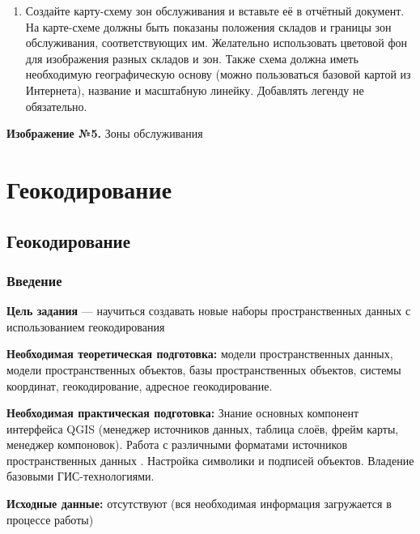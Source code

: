 \documentclass[
  12pt,
]{book}
\providecommand{\tightlist}{%
  \setlength{\itemsep}{0pt}\setlength{\parskip}{0pt}}
\begin{document}
\begin{enumerate}
\def\labelenumi{\arabic{enumi}.}
\setcounter{enumi}{12}
\tightlist
\item
  Создайте карту-схему зон обслуживания и вставьте её в отчётный документ. На карте-схеме должны быть показаны положения складов и границы зон обслуживания, соответствующих им. Желательно использовать цветовой фон для изображения разных складов и зон. Также схема должна иметь необходимую географическую основу (можно пользоваться базовой картой из Интернета), название и масштабную линейку. Добавлять легенду не обязательно.
\end{enumerate}

\textbf{Изображение №5.} Зоны обслуживания

\hypertarget{part-ux433ux435ux43eux43aux43eux434ux438ux440ux43eux432ux430ux43dux438ux435}{%
\part{Геокодирование}\label{part-ux433ux435ux43eux43aux43eux434ux438ux440ux43eux432ux430ux43dux438ux435}}

\hypertarget{geocoding}{%
\chapter{Геокодирование}\label{geocoding}}

\hypertarget{geoding-intro}{%
\section{Введение}\label{geoding-intro}}

\textbf{Цель задания} --- научиться создавать новые наборы пространственных данных с использованием геокодирования

\textbf{Необходимая теоретическая подготовка:} модели пространственных данных, модели пространственных объектов, базы пространственных объектов, системы координат, геокодирование, адресное геокодирование.

\textbf{Необходимая практическая подготовка:} Знание основных компонент интерфейса QGIS (менеджер источников данных, таблица слоёв, фрейм карты, менеджер компоновок). Работа с различными форматами источников пространственных данных . Настройка символики и подписей объектов. Владение базовыми ГИС-технологиями.

\textbf{Исходные данные:} отсутствуют (вся необходимая информация загружается в процессе работы)
\end{document}
